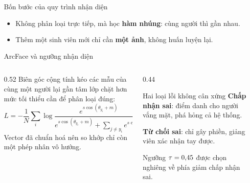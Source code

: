 \documentclass[aspectratio=169, 11pt]{beamer}
\begin{document}
\begin{frame}{Bốn bước của quy trình nhận diện}
  \begin{center}
  \end{center}
  \vfill
  \begin{itemize}
    \item Không phân loại trực tiếp, mà học \textbf{hàm nhúng}: cùng người thì gần nhau.
    \item Thêm một sinh viên mới chỉ cần \textbf{một ảnh}, không huấn luyện lại.
  \end{itemize}
\end{frame}

\begin{frame}{ArcFace và ngưỡng nhận diện}
  \begin{columns}[T]
    \begin{column}{0.52\textwidth}
      Biên góc cộng tính kéo các mẫu của cùng một người lại gần tâm lớp
      chặt hơn mức tối thiểu cần để phân loại đúng:
      \vspace{0.3em}
      \[
        L = -\frac{1}{N}\sum_{i}
        \log \frac{e^{s\cos(\theta_{y_i}+m)}}
        {e^{s\cos(\theta_{y_i}+m)} + \sum_{j \neq y_i} e^{s\cos\theta_j}}
      \]
      \vspace{0.1em}
      Vector đã chuẩn hoá nên so khớp chỉ còn một phép nhân vô hướng.
    \end{column}
    \begin{column}{0.44\textwidth}
      \begin{block}{Hai loại lỗi không cân xứng}
        \textbf{Chấp nhận sai}: điểm danh cho người vắng mặt, phá hỏng cả hệ thống.

        \vspace{4pt}
        \textbf{Từ chối sai}: chỉ gây phiền, giảng viên xác nhận tay được.
      \end{block}
      \vspace{0.2em}
      {\small Ngưỡng $\tau = 0{,}45$ được chọn nghiêng về phía
      giảm chấp nhận sai.}
    \end{column}
  \end{columns}
\end{frame}
\end{document}
